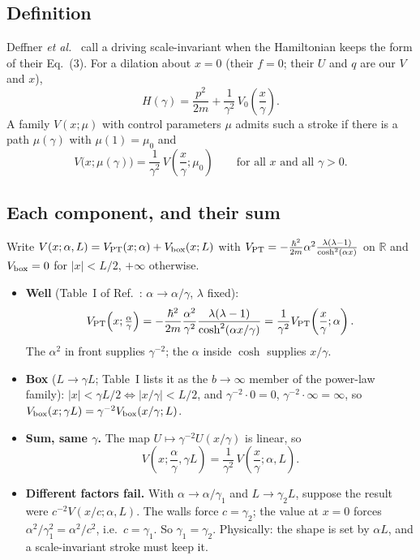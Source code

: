 \documentclass[11pt]{article}
\numberwithin{equation}{section}
\begin{document}
\subsection{Definition}
Deffner \emph{et al.}~\cite[p.~021013-2, Eq.~(3)]{deffner2014} call a driving scale-invariant when the Hamiltonian keeps the form of their Eq.~(3). For a dilation about $x=0$ (their $f=0$; their $U$ and $q$ are our $V$ and $x$),
\begin{equation}
H(\gamma)=\frac{p^2}{2m}+\frac{1}{\gamma^2}\,V_0\!\left(\frac{x}{\gamma}\right).
\label{eq:Hscale}
\end{equation}
A family $V(x;\mu)$ with control parameters $\mu$ admits such a stroke if there is a path $\mu(\gamma)$ with $\mu(1)=\mu_0$ and
\begin{equation}
V\big(x;\mu(\gamma)\big)=\frac{1}{\gamma^2}\,V\!\left(\frac{x}{\gamma};\mu_0\right)\qquad\text{for all }x\text{ and all }\gamma>0 .
\label{eq:scaleinv}
\end{equation}

\subsection{Each component, and their sum}
Write $V(x;\alpha,L)=V_{\rm PT}(x;\alpha)+V_{\rm box}(x;L)$ with $V_{\rm PT}=-\frac{\hbar^2}{2m}\alpha^2\frac{\lambda(\lambda-1)}{\cosh^2(\alpha x)}$ on $\mathbb R$ and $V_{\rm box}=0$ for $|x|<L/2$, $+\infty$ otherwise.
\begin{itemize}[itemsep=2pt]
\item \textbf{Well} (Table~I of Ref.~\cite[p.~021013-9]{deffner2014}: $\alpha\to\alpha/\gamma$, $\lambda$ fixed):
\[
V_{\rm PT}\!\left(x;\tfrac{\alpha}{\gamma}\right)=-\frac{\hbar^2}{2m}\frac{\alpha^2}{\gamma^2}\frac{\lambda(\lambda-1)}{\cosh^2(\alpha x/\gamma)}=\frac{1}{\gamma^2}V_{\rm PT}\!\left(\frac{x}{\gamma};\alpha\right).
\]
The $\alpha^2$ in front supplies $\gamma^{-2}$; the $\alpha$ inside $\cosh$ supplies $x/\gamma$.
\item \textbf{Box} ($L\to\gamma L$; Table~I lists it as the $b\to\infty$ member of the power-law family): $|x|<\gamma L/2\iff|x/\gamma|<L/2$, and $\gamma^{-2}\cdot0=0$, $\gamma^{-2}\cdot\infty=\infty$, so $V_{\rm box}(x;\gamma L)=\gamma^{-2}V_{\rm box}(x/\gamma;L)$.
\item \textbf{Sum, same $\gamma$.} The map $U\mapsto\gamma^{-2}U(x/\gamma)$ is linear, so
\begin{equation}
V\!\left(x;\frac{\alpha}{\gamma},\gamma L\right)=\frac{1}{\gamma^2}\,V\!\left(\frac{x}{\gamma};\alpha,L\right).
\label{eq:sumscale}
\end{equation}
\item \textbf{Different factors fail.} With $\alpha\to\alpha/\gamma_1$ and $L\to\gamma_2L$, suppose the result were $c^{-2}V(x/c;\alpha,L)$. The walls force $c=\gamma_2$; the value at $x=0$ forces $\alpha^2/\gamma_1^2=\alpha^2/c^2$, i.e.\ $c=\gamma_1$. So $\gamma_1=\gamma_2$. Physically: the shape is set by $\alpha L$, and a scale-invariant stroke must keep it.
\end{itemize}
\end{document}
